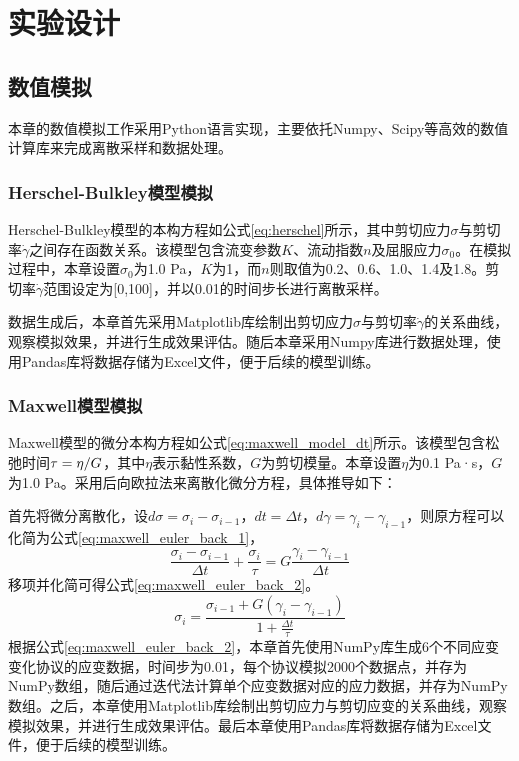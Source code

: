\section{实验设计}
\subsection{数值模拟}
本章的数值模拟工作采用Python语言实现，主要依托Numpy、Scipy等高效的数值计算库来完成离散采样和数据处理。
\subsubsection{Herschel-Bulkley模型模拟}
Herschel-Bulkley模型的本构方程如公式\eqref{eq:herschel}所示，其中剪切应力$\sigma$与剪切率$\dot{\gamma}$之间存在函数关系。该模型包含流变参数$K$、流动指数$n$及屈服应力$\sigma_0$。在模拟过程中，本章设置$\sigma_0$为1.0 Pa，$K$为1，而$n$则取值为0.2、0.6、1.0、1.4及1.8。剪切率$\dot{\gamma}$范围设定为[0,100]，并以0.01的时间步长进行离散采样。

数据生成后，本章首先采用Matplotlib库绘制出剪切应力$\sigma$与剪切率$\dot{\gamma}$的关系曲线，观察模拟效果，并进行生成效果评估。随后本章采用Numpy库进行数据处理，使用Pandas库将数据存储为Excel文件，便于后续的模型训练。
\subsubsection{Maxwell模型模拟}
Maxwell模型的微分本构方程如公式\eqref{eq:maxwell_model_dt}所示。该模型包含松弛时间$\tau=\eta/\\G$，其中$\eta$表示黏性系数，$G$为剪切模量。本章设置$\eta$为0.1 Pa·s，$G$为1.0 Pa。采用后向欧拉法来离散化微分方程，具体推导如下：

首先将微分离散化，设$d\sigma=\sigma_i - \sigma_{i-1}$，$dt=\Delta t$，$d\gamma=\gamma_i - \gamma_{i-1}$，则原方程可以化简为公式\eqref{eq:maxwell_euler_back_1}，
\begin{equation}
  \frac{\sigma_i - \sigma_{i-1}}{\Delta t} + \frac{\sigma_i}{\tau} = G \frac{\gamma_i - \gamma_{i-1}}{\Delta t} \label{eq:maxwell_euler_back_1}
\end{equation}
移项并化简可得公式\eqref{eq:maxwell_euler_back_2}。
\begin{equation}
  \sigma_i = \frac{\sigma_{i-1} + G (\gamma_i - \gamma_{i-1})}{1 + \frac{\Delta t}{\tau}} \label{eq:maxwell_euler_back_2}
\end{equation}
根据公式\eqref{eq:maxwell_euler_back_2}，本章首先使用NumPy库生成6个不同应变变化协议的应变数据，时间步为0.01，每个协议模拟2000个数据点，并存为NumPy数组，随后通过迭代法计算单个应变数据对应的应力数据，并存为NumPy数组。之后，本章使用Matplotlib库绘制出剪切应力与剪切应变的关系曲线，观察模拟效果，并进行生成效果评估。最后本章使用Pandas库将数据存储为Excel文件，便于后续的模型训练。
